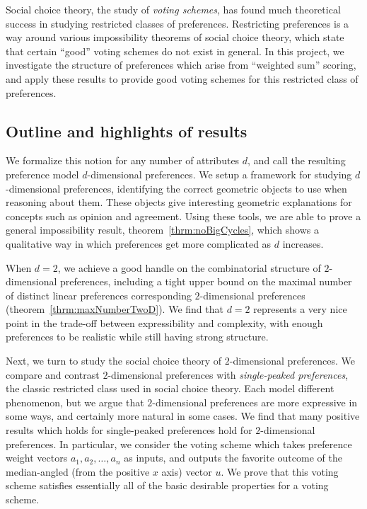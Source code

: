 \documentclass[12pt]{article}
\newcommand{\1}[1]{\mathds{1}[{#1}]}
\begin{document}
  Social choice theory, the study of \emph{voting schemes},
  has found much theoretical success in studying restricted classes of preferences.
  Restricting preferences is a way around various impossibility theorems of
  social choice theory, which state that certain ``good'' voting schemes do not
  exist in general. In this project, we investigate the structure of preferences
  which arise from ``weighted sum'' scoring, and apply these results to provide
  good voting schemes for this restricted class of preferences.

  \subsection{Outline and highlights of results}
    We formalize this notion for any number of attributes $d$,
    and call the resulting preference model $d$-dimensional preferences.
    We setup a framework for studying $d$-dimensional preferences,
    identifying the correct geometric objects to use when reasoning about them.
    These objects give interesting geometric explanations for concepts such as
    opinion and agreement.
    Using these tools, we are able to prove a general impossibility result,
    theorem~\ref{thrm:noBigCycles}, which shows
    a qualitative way in which preferences get more complicated as $d$ increases.

    When $d=2$, we achieve a good handle on the combinatorial structure of
    $2$-dimensional preferences, including
    a tight upper bound on the maximal number of
    distinct linear preferences corresponding
    $2$-dimensional preferences (theorem~\ref{thrm:maxNumberTwoD}).
    We find that $d=2$ represents a very nice point in the trade-off
    between expressibility and complexity, with enough preferences to be
    realistic while still having strong structure.

    Next, we turn to study the social choice theory of $2$-dimensional
    preferences. We compare and contrast $2$-dimensional preferences with 
    \emph{single-peaked preferences}, the
    classic restricted class used in social choice theory.
    Each model different phenomenon, but we argue that $2$-dimensional
    preferences are more expressive in some ways, and certainly more natural in
    some cases. We find that many positive results which holds for
    single-peaked preferences hold for $2$-dimensional preferences.
    In particular, we consider the voting scheme which takes 
    preference weight vectors $a_1,a_2,\ldots,a_n$ as inputs,
    and outputs the favorite outcome of the median-angled (from the positive $x$
    axis) vector $u$.
    We prove that this voting scheme
    satisfies essentially all of the basic desirable properties for a voting scheme.
\end{document}
